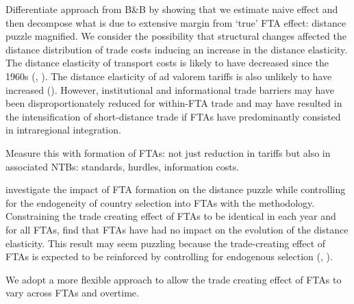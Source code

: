 \documentclass[12pt,twoside,a4paper,notitlepage]{article}
\begin{document}
Differentiate approach from B\&B by showing that we estimate naive effect and then decompose what is due to extensive margin from `true' FTA effect: distance puzzle magnified.
We consider the possibility that structural changes affected the distance distribution of trade costs inducing an increase in the distance elasticity.
The distance elasticity of transport costs is likely to have decreased since the 1960s (\cite{Hummels2007}, \cite{Berthelon2008}).
The distance elasticity of ad valorem tariffs is also unlikely to have increased (\cite{Berthelon2008}).
However, institutional and informational trade barriers may have been disproportionately reduced for within-FTA trade and may have resulted in the intensification of short-distance trade if FTAs have predominantly consisted in intraregional integration.

Measure this with formation of FTAs: not just reduction in tariffs but also in associated NTBs: standards, hurdles, information costs.


\cite{Bosquet2015} investigate the impact of FTA formation on the distance puzzle while controlling for the endogeneity of country selection into FTAs with the \cite{Baier2007} methodology.
Constraining the trade creating effect of FTAs to be identical in each year and for all FTAs, \cite{Bosquet2015} find that FTAs have had no impact on the evolution of the distance elasticity.
This result may seem puzzling because the trade-creating effect of FTAs is expected to be reinforced by controlling for endogenous selection (\cite{Baier2007}, \cite{Egger2011}).


We adopt a more flexible approach to allow the trade creating effect of FTAs to vary across FTAs and overtime.
\end{document}
